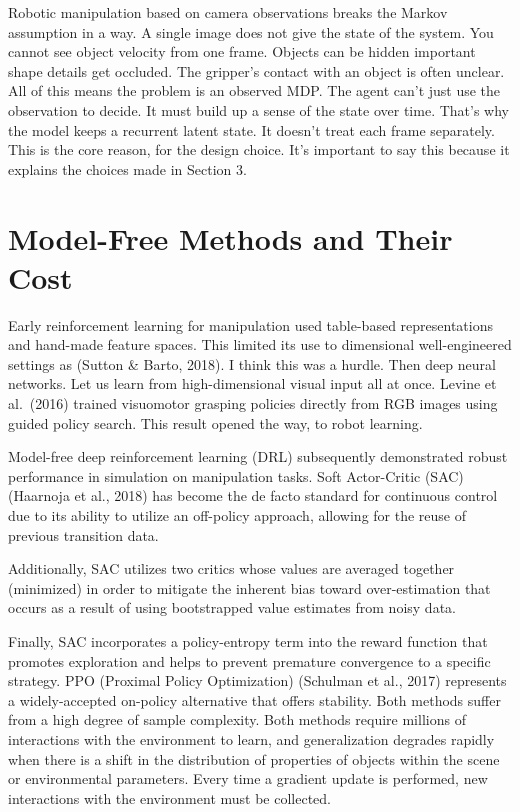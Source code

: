 \documentclass[12pt,a4paper,oneside]{report}
\begin{document}
Robotic manipulation based on camera observations breaks the Markov assumption in a way. A single image does not give the state of the system. You cannot see object velocity from one frame. Objects can be hidden important shape details get occluded. The gripper’s contact with an object is often unclear. All of this means the problem is an observed MDP. The agent can't just use the observation to decide. It must build up a sense of the state over time. That's why the model keeps a recurrent latent state. It doesn't treat each frame separately. This is the core reason, for the design choice. It's important to say this because it explains the choices made in Section 3.

\hypertarget{model-free-methods-and-their-cost}{%
\section{Model-Free Methods and Their Cost}\label{model-free-methods-and-their-cost}}
Early reinforcement learning for manipulation used table-based representations and hand-made feature spaces. This limited its use to dimensional well-engineered settings as (Sutton \& Barto, 2018). I think this was a hurdle. Then deep neural networks. Let us learn from high-dimensional visual input all at once. Levine et al.~(2016) trained visuomotor grasping policies directly from RGB images using guided policy search. This result opened the way, to robot learning.

Model-free deep reinforcement learning (DRL) subsequently demonstrated robust performance in simulation on manipulation tasks. Soft Actor-Critic (SAC) (Haarnoja et al., 2018) has become the de facto standard for continuous control due to its ability to utilize an off-policy approach, allowing for the reuse of previous transition data.

Additionally, SAC utilizes two critics whose values are averaged together (minimized) in order to mitigate the inherent bias toward over-estimation that occurs as a result of using bootstrapped value estimates from noisy data.

Finally, SAC incorporates a policy-entropy term into the reward function that promotes exploration and helps to prevent premature convergence to a specific strategy. PPO (Proximal Policy Optimization) (Schulman et al., 2017) represents a widely-accepted on-policy alternative that offers stability. Both methods suffer from a high degree of sample complexity. Both methods require millions of interactions with the environment to learn, and generalization degrades rapidly when there is a shift in the distribution of properties of objects within the scene or environmental parameters. Every time a gradient update is performed, new interactions with the environment must be collected.
\end{document}
